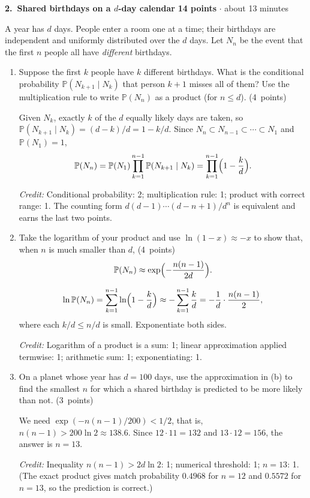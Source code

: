 \documentclass[11pt,letterpaper]{article}
\newcommand{\Prob}{\mathbb P}
\newcommand{\partpts}[1]{\unskip\nobreak\hspace{.3em}%
  \mbox{\small\color{muted}(#1 points)}}
\newcommand{\credit}[1]{\par{\footnotesize\color{muted}\textit{Credit:} #1}}
\newcommand{\problem}[4]{\par\addvspace{8pt}%
  {\large\bfseries\color{indigo}#1.\ #2}\hfill
  {\small\color{muted}\textbf{#3 points} $\cdot$ about #4 minutes}\par\nobreak}
\begin{document}
\ifanswers\else\newpage\fi
\problem{2}{Shared birthdays on a $d$-day calendar}{14}{13}
A year has $d$ days. People enter a room one at a time; their birthdays are
independent and uniformly distributed over the $d$ days.
Let $N_n$ be the event that the first $n$ people all have \emph{different}
birthdays.
\begin{enumerate}
  \item Suppose the first $k$ people have $k$ different birthdays. What is the
  conditional probability $\Prob(N_{k+1}\mid N_k)$ that person $k+1$ misses all
  of them? Use the multiplication rule to write $\Prob(N_n)$ as a product
  (for $n\le d$). \partpts{4}
  \begin{solution}[1.5in]
    Given $N_k$, exactly $k$ of the $d$ equally likely days are taken, so
    $\Prob(N_{k+1}\mid N_k)=(d-k)/d=1-k/d$. Since
    $N_n\subset N_{n-1}\subset\cdots\subset N_1$ and $\Prob(N_1)=1$,
    \[
      \Prob(N_n)=\Prob(N_1)\prod_{k=1}^{n-1}\Prob(N_{k+1}\mid N_k)
      =\prod_{k=1}^{n-1}\Bigl(1-\frac kd\Bigr).
    \]
    \credit{Conditional probability: 2; multiplication rule: 1; product with
    correct range: 1. The counting form $d(d-1)\cdots(d-n+1)/d^n$ is
    equivalent and earns the last two points.}
  \end{solution}

  \item Take the logarithm of your product and use $\ln(1-x)\approx-x$ to
  show that, when $n$ is much smaller than $d$, \partpts{4}
  \[
    \Prob(N_n)\approx\exp\Bigl(-\frac{n(n-1)}{2d}\Bigr).
  \]
  \begin{solution}[1.7in]
    \[
      \ln\Prob(N_n)=\sum_{k=1}^{n-1}\ln\Bigl(1-\frac kd\Bigr)
      \approx-\sum_{k=1}^{n-1}\frac kd
      =-\frac1d\cdot\frac{n(n-1)}2 ,
    \]
    where each $k/d\le n/d$ is small. Exponentiate both sides.
    \credit{Logarithm of a product is a sum: 1; linear approximation applied
    termwise: 1; arithmetic sum: 1; exponentiating: 1.}
  \end{solution}

  \item On a planet whose year has $d=100$ days, use the approximation in (b)
  to find the smallest $n$ for which a shared birthday is predicted to be
  more likely than not. \partpts{3}
  \begin{solution}[1.4in]
    We need $\exp(-n(n-1)/200)<1/2$, that is,
    $n(n-1)>200\ln2\approx138.6$. Since $12\cdot11=132$ and
    $13\cdot12=156$, the answer is $n=13$.
    \credit{Inequality $n(n-1)>2d\ln2$: 1; numerical threshold: 1; $n=13$: 1.}
    {\footnotesize\color{muted}(The exact product gives match probability
    $0.4968$ for $n=12$ and $0.5572$ for $n=13$, so the prediction is
    correct.)}
  \end{solution}


\end{enumerate}
\end{document}
